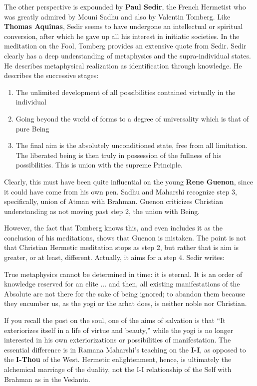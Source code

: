 The other perspective is expounded by \textbf{Paul Sedir}, the French Hermetist who was greatly admired by Mouni Sadhu and also by Valentin Tomberg. Like \textbf{Thomas Aquinas}, Sedir seems to have undergone an intellectual or spiritual conversion, after which he gave up all his interest in initiatic societies. In the meditation on the Fool, Tomberg provides an extensive quote from Sedir. Sedir clearly has a deep understanding of metaphysics and the supra-individual states. He describes metaphysical realization as identification through knowledge. He describes the successive stages:

\begin{enumerate}

\item The unlimited development of all possibilities contained virtually in the individual

\item Going beyond the world of forms to a degree of universality which is that of pure Being

\item The final aim is the absolutely unconditioned state, free from all limitation. The liberated being is then truly in possession of the fullness of his possibilities. This is union with the supreme Principle.
\end{enumerate}


Clearly, this must have been quite influential on the young \textbf{Rene Guenon}, since it could have come from his own pen. Sadhu and Maharshi recognize step 3, specifically, union of Atman with Brahman. Guenon criticizes Christian understanding as not moving past step 2, the union with Being.

However, the fact that Tomberg knows this, and even includes it as the conclusion of his meditations, shows that Guenon is mistaken. The point is not that Christian Hermetic meditation stops as step 2, but rather that is aim is greater, or at least, different. Actually, it aims for a step 4. Sedir writes:

\begin{quotex}
True metaphysics cannot be determined in time: it is eternal. It is an order of knowledge reserved for an elite ... and then, all existing manifestations of the Absolute are not there for the sake of being ignored; to abandon them because they encumber us, as the yogi or the arhat does, is neither noble nor Christian.
\end{quotex}


If you recall the post on the soul, one of the aims of salvation is that ``It exteriorizes itself in a life of virtue and beauty,'' while the yogi is no longer interested in his own exteriorizations or possibilities of manifestation. The essential difference is in Ramana Maharshi's teaching on the \textbf{I-I}, as opposed to the \textbf{I-Thou} of the West. Hermetic enlightenment, hence, is ultimately the alchemical marriage of the duality, not the I-I relationship of the Self with Brahman as in the Vedanta.

